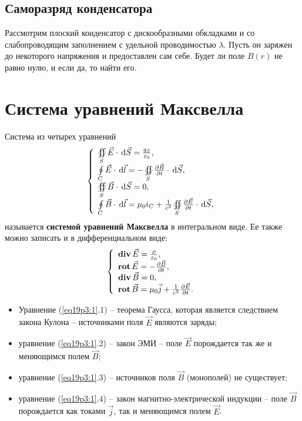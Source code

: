     \subsection{Саморазряд конденсатора}
        Рассмотрим плоский конденсатор с дискообразными обкладками и со
        слабопроводящим заполнением с удельной проводимостью \( \lambda \).
        Пусть он заряжен до некоторого напряжения и предоставлен сам себе.
        Будет ли поле \( B(r) \) не равно нулю, и если да, то найти его.

\section{Система уравнений Максвелла}

	Система из четырех уравнений
	\begin{equation}
        \left\{
        \begin{array}{l}
            \oiint\limits_S \vec{E}\cdot\,\mathrm{d}\vec{S} = \frac{q_S}{\varepsilon_0}, \\
            \oint\limits_C \vec{E}\cdot\,\mathrm{d}\vec{l} =
            -\oiint\limits_S \frac{\partial \vec{B}}{\partial t}\cdot\,\mathrm{d}\vec{S}, \\
            \oiint\limits_S \vec{B}\cdot\,\mathrm{d}\vec{S} = 0, \\
            \oint\limits_C \vec{B}\cdot\,\mathrm{d}\vec{l} = \mu_0i_C +
            \frac{1}{c^2}\oiint\limits_S \frac{\partial \vec{E}}{\partial t}\cdot\,\mathrm{d}\vec{S},
        \end{array}
        \right.
        \label{eq19p3:1}
    \end{equation}
	называется \textbf{системой уравнений Максвелла} в интегральном виде. Ее
    также можно записать и в дифференциальном виде:
	\[
        \left\{
        \begin{array}{l}
            \mathbf{div\,}\vec{E} = \frac{\rho}{\varepsilon_0}, \\
            \mathbf{rot\,}\vec{E} = -\frac{\partial \vec{B}}{\partial t}, \\
            \mathbf{div\,}\vec{B} = 0, \\
            \mathbf{rot\,}\vec{B} = \mu_0\vec{j} + \frac{1}{c^2}\frac{\partial \vec{E}}{\partial t}.
        \end{array}
        \right.
    \]
    \begin{itemize}
        \item Уравнение (\ref{eq19p3:1}.1) -- теорема Гаусса, которая является
            следствием закона Кулона -- источниками поля \( \vec{E} \) являются
            заряды;
        \item уравнение (\ref{eq19p3:1}.2) -- закон ЭМИ -- поле \( \vec{E} \)
            порождается так же и меняющимся полем \( \vec{B} \);
        \item уравнение (\ref{eq19p3:1}.3) -- источников поля \( \vec{B} \)
            (монополей) не существует;
        \item уравнение (\ref{eq19p3:1}.4) -- закон магнитно-электрической
            индукции -- поле \( \vec{B} \) порождается как токами \( \vec{j} \),
            так и меняющимся полем \( \vec{E} \).
    \end{itemize}
	
